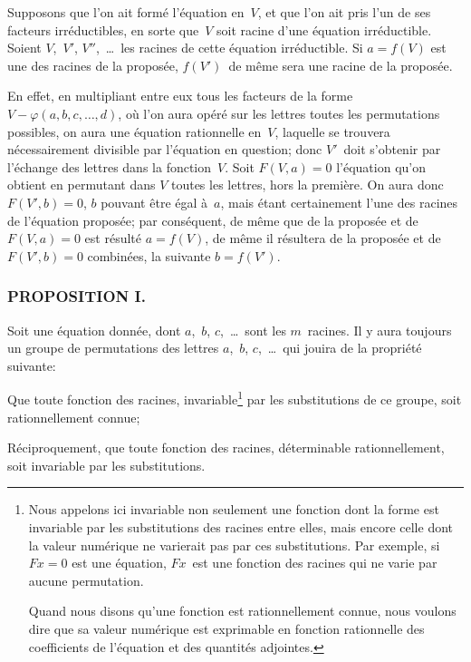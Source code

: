 \documentclass[leqno,12pt]{book}[2005/09/16]
\newcommand{\Subsection}[1]{\subsubsection*{\centering\small\normalfont #1}}
\newenvironment{MyEnvt}[2]{%
  \medskip\par
  \ifthenelse{\equal{#1}{}}{%
    \textsc{#2.}\ --- %
  }{%
    \textsc{#2 #1}\ --- %
  }%
  \itshape\ignorespaces
}{\medskip\normalfont}
\newenvironment{Theoreme}[1][]{\begin{MyEnvt}{#1}{Theorème}}{\end{MyEnvt}}
\newenvironment{Lemme}[1][]{\begin{MyEnvt}{#1}{Lemme}}{\end{MyEnvt}}
\renewcommand{\phi}{\varphi}
\let\Primo=\primo
\let\Secundo=\secundo
\renewcommand{\primo}{{\upshape\Primo}}
\renewcommand{\secundo}{{\upshape\Secundo}}
\begin{document}
\begin{Lemme}[IV]
Supposons que l'on ait formé l'équation en~$V$,
et que l'on ait pris l'un de ses facteurs irréductibles, en sorte
que~$V$ soit racine d'une équation irréductible. Soient $V$,~$V'$,
$V''$,~\dots\ les racines de cette équation irréductible. Si $a = f(V)$
est une des racines de la proposée, $f(V')$~de même sera une racine
de la proposée.
\end{Lemme}

En effet, en multipliant entre eux tous les facteurs de la forme
$V - \phi (a, b, c, \dots, d)$, où l'on aura opéré sur les lettres toutes
les permutations possibles, on aura une équation rationnelle en~$V$,
laquelle se trouvera nécessairement divisible par l'équation en
question; donc $V'$~doit s'obtenir par l'échange des lettres dans la
fonction~$V$. Soit $F(V, a) = 0$ l'équation qu'on obtient en permutant
dans $V$ toutes les lettres, hors la première. On aura donc
$F(V', b) = 0$, $b$ pouvant être égal à~$a$, mais étant certainement
l'une des racines de l'équation proposée; par conséquent, de
même que de la proposée et de $F(V, a) = 0$ est résulté $a = f(V)$,
de même il résultera de la proposée et de $F(V', b) = 0$ combinées,
la suivante $b = f(V')$.


\Subsection{PROPOSITION I.}

\begin{Theoreme}
Soit une équation donnée, dont $a$,~$b$, $c$,~\dots\
sont les $m$~racines. Il y aura toujours un groupe de permutations
des lettres $a$,~$b$, $c$,~\dots\ qui jouira de la propriété suivante:

\primo Que toute fonction des racines, invariable\footnote
  {Nous appelons ici invariable non seulement une fonction dont la forme est
  invariable par les substitutions des racines entre elles, mais encore celle dont la
  valeur numérique ne varierait pas par ces substitutions. Par exemple, si $Fx = 0$
  est une équation, $Fx$~est une fonction des racines qui ne varie par aucune permutation.

  Quand nous disons qu'une fonction est rationnellement connue, nous voulons
  dire que sa valeur numérique est exprimable en fonction rationnelle des coefficients
  de l'équation et des quantités adjointes.}
par les substitutions
de ce groupe, soit rationnellement connue;

\secundo Réciproquement, que toute fonction des racines, déterminable
rationnellement, soit invariable par les substitutions.
\end{Theoreme}
\end{document}
